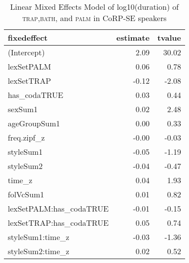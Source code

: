 \begin{table}[ht]
\centering
\begin{tabular}{lrr}
  \hline
fixedeffect & estimate & tvalue \\ 
  \hline
(Intercept) & 2.09 & 30.02 \\ 
  lexSetPALM & 0.06 & 0.78 \\ 
  lexSetTRAP & -0.12 & -2.08 \\ 
  has\_codaTRUE & 0.03 & 0.44 \\ 
  sexSum1 & 0.02 & 2.48 \\ 
  ageGroupSum1 & 0.00 & 0.33 \\ 
  freq.zipf\_z & -0.00 & -0.03 \\ 
  styleSum1 & -0.05 & -1.19 \\ 
  styleSum2 & -0.04 & -0.47 \\ 
  time\_z & 0.04 & 1.93 \\ 
  folVcSum1 & 0.01 & 0.82 \\ 
  lexSetPALM:has\_codaTRUE & -0.01 & -0.15 \\ 
  lexSetTRAP:has\_codaTRUE & 0.05 & 0.74 \\ 
  styleSum1:time\_z & -0.03 & -1.36 \\ 
  styleSum2:time\_z & 0.02 & 0.52 \\ 
   \hline
\end{tabular}
\caption{Linear Mixed Effects Model of log10(duration) of \textsc{trap},\textsc{bath}, and \textsc{palm} in CoRP-SE speakers \label{tbl:TBPlogdurSE}} 
\end{table}
